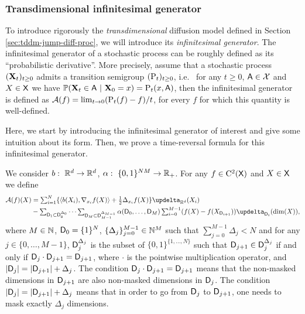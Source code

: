 \subsubsection{Transdimensional infinitesimal generator}

To introduce rigorously the \emph{transdimensional} diffusion model defined in
Section \ref{sec:tddm-jump-diff-proc}, we will introduce its \emph{infinitesimal
  generator}. The infinitesimal generator of a stochastic process can be roughly
defined as its ``probabilistic derivative''. More precisely, assume that a
stochastic process $(\mathbf{X}_t)_{t \geq 0}$ admits a transition semigroup
$(\mathrm{P}_t)_{t \geq 0}$, i.e.~ for any $t \geq 0$, $\mathsf{A} \in \mathcal{X}$ and
$X \in \mathsf{X}$ we have
$\mathbb{P}(\mathbf{X}_t \in \mathsf{A} \ | \ \mathbf{X}_0 = x) = \mathrm{P}_t(x, \mathsf{A})$, then the
infinitesimal generator is defined as
$\mathcal{A}(f) = \lim_{t \to 0} (\mathrm{P}_t(f) - f)/t$, for every $f$ for which this
quantity is well-defined.

Here, we start by introducing the infinitesimal generator of interest and give
some intuition about its form. Then, we prove a time-reversal formula for this
infinitesimal generator. 

We consider $b: \ \mathbb{R}^d \to \mathbb{R}^d$, $\alpha: \ \{0,1\}^{NM} \to \mathbb{R}_+$. 
For any $f \in \mathrm{C}^2(\mathsf{X})$ and $X \in \mathsf{X}$ we define
\begin{align}
  \label{eq:definition_generator}
  \calA(f)(X) &\textstyle= \sum_{i=1}^N \{ \langle b(X_i), \nabla_{x_i}f(X) \rangle + \tfrac{1}{2} \Delta_{x_i}f(X)\} \updelta_{\rset^d}(X_i) \\
  & -\textstyle \sum_{\msd_1 \subset \msd_0^{\Delta_0}} \dots  \sum_{\msd_M \subset \msd_{M-1}^{\Delta_{M-1}}} \alpha(\msd_0, \dots, \msd_M) \sum_{i=0}^{M-1} (f(X) - f(X_{\msd_{i+1}})) \updelta_{\msd_i}(\dim(X)) ,
\end{align}
where $M \in \mathbb{N}$, $\mathsf{D}_0 = \{1\}^N$,
$\{\Delta_j\}_{j=0}^{M-1} \in \mathbb{N}^{M}$ such that
$\sum_{j=0}^{M-1} \Delta_j < N$ and for any $j \in \{0, \dots, M-1\}$,
$\mathsf{D}_j^{\Delta_j}$ is the subset of $\{0,1\}^{\{1, \dots, N\}}$ such that
$\mathsf{D}_{j+1} \in \mathsf{D}_j^{\Delta_j}$ if and only if
$\mathsf{D}_j \cdot \mathsf{D}_{j+1} = \mathsf{D}_{j+1}$, where $\cdot$ is the pointwise
multiplication operator, and $|\mathsf{D}_j| = |\mathsf{D}_{j+1}| + \Delta_j$. The condition
$\mathsf{D}_j \cdot \mathsf{D}_{j+1} = \mathsf{D}_{j+1}$ means that the non-masked dimensions in
$\mathsf{D}_{j+1}$ are also non-masked dimensions in $\mathsf{D}_j$. The condition
$|\mathsf{D}_j| = |\mathsf{D}_{j+1}| + \Delta_j$ means that in order to go from $\mathsf{D}_j$ to
$\mathsf{D}_{j+1}$, one needs to mask exactly $\Delta_j$ dimensions.

